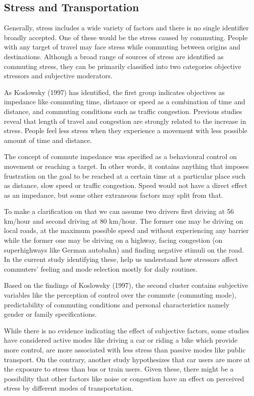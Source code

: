 \documentclass[
11pt, %
oneside, %
english, %
singlespacing, %
]{macthesis} %
\begin{document}
\hypertarget{stress-and-transportation}{%
\subsection{Stress and Transportation}\label{stress-and-transportation}}

Generally, stress includes a wide variety of factors and there is no single identifier broadly accepted. One of these would be the stress caused by commuting. People with any target of travel may face stress while commuting between origins and destinations. Although a broad range of sources of stress are identified as commuting stress, they can be primarily classified into two categories objective stressors and subjective moderators.

As Koslowsky (1997) has identified, the first group indicates objectives as impedance like commuting time, distance or speed as a combination of time and distance, and commuting conditions such as traffic congestion. Previous studies reveal that length of travel and congestion are strongly related to the increase in stress. People feel less stress when they experience a movement with less possible amount of time and distance.

The concept of commute impedance was specified as a behavioural control on movement or reaching a target. In other words, it contains anything that imposes frustration on the goal to be reached at a certain time at a particular place such as distance, slow speed or traffic congestion. Speed would not have a direct effect as an impedance, but some other extraneous factors may split from that.

To make a clarification on that we can assume two drivers first driving at 56 km/hour and second driving at 80 km/hour. The former one may be driving on local roads, at the maximum possible speed and without experiencing any barrier while the former one may be driving on a highway, facing congestion (on superhighways like German autobahn) and finding negative stimuli on the road. In the current study identifying these, help us understand how stressors affect commuters' feeling and mode selection mostly for daily routines.

Based on the findings of Koslowsky (1997), the second cluster contains subjective variables like the perception of control over the commute (commuting mode), predictability of commuting conditions and personal characteristics namely gender or family specifications.

While there is no evidence indicating the effect of subjective factors, some studies have considered active modes like driving a car or riding a bike which provide more control, are more associated with less stress than passive modes like public transport. On the contrary, another study hypothesizes that car users are more at the exposure to stress than bus or train users. Given these, there might be a possibility that other factors like noise or congestion have an effect on perceived stress by different modes of transportation.
\end{document}
